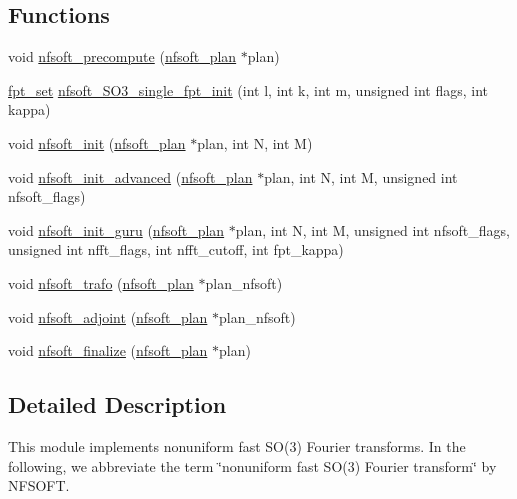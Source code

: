 \subsection*{Functions}
\begin{DoxyCompactItemize}
\item 
void \hyperlink{group__nfsoft_ga123df5d17a0d43fe5e061ac0fb8c1d23}{nfsoft\-\_\-precompute} (\hyperlink{structnfsoft__plan__}{nfsoft\-\_\-plan} $\ast$plan)
\item 
\hyperlink{nfft3_8h_a73d630ac21d6474ba0693f124d465e15}{fpt\-\_\-set} \hyperlink{group__nfsoft_gad8bf7646fcf34c3cda08123798ca5c95}{nfsoft\-\_\-\-S\-O3\-\_\-single\-\_\-fpt\-\_\-init} (int l, int k, int m, unsigned int flags, int kappa)
\item 
void \hyperlink{group__nfsoft_ga31c884458165fa204073c6c16c10775e}{nfsoft\-\_\-init} (\hyperlink{structnfsoft__plan__}{nfsoft\-\_\-plan} $\ast$plan, int N, int M)
\item 
void \hyperlink{group__nfsoft_gaf4aec4ee2a2a5d56ca27c4f1a7f90b18}{nfsoft\-\_\-init\-\_\-advanced} (\hyperlink{structnfsoft__plan__}{nfsoft\-\_\-plan} $\ast$plan, int N, int M, unsigned int nfsoft\-\_\-flags)
\item 
void \hyperlink{group__nfsoft_ga1c13cdd3f82f48fa41acdd313cdc2052}{nfsoft\-\_\-init\-\_\-guru} (\hyperlink{structnfsoft__plan__}{nfsoft\-\_\-plan} $\ast$plan, int N, int M, unsigned int nfsoft\-\_\-flags, unsigned int nfft\-\_\-flags, int nfft\-\_\-cutoff, int fpt\-\_\-kappa)
\item 
void \hyperlink{group__nfsoft_gae243cd75d7571a99eae53818e32355fb}{nfsoft\-\_\-trafo} (\hyperlink{structnfsoft__plan__}{nfsoft\-\_\-plan} $\ast$plan\-\_\-nfsoft)
\item 
void \hyperlink{group__nfsoft_ga08395b1dd90f9a2565685d17460afc5b}{nfsoft\-\_\-adjoint} (\hyperlink{structnfsoft__plan__}{nfsoft\-\_\-plan} $\ast$plan\-\_\-nfsoft)
\item 
void \hyperlink{group__nfsoft_ga30b5c6ae1ff496680f11ddcaad2d5a47}{nfsoft\-\_\-finalize} (\hyperlink{structnfsoft__plan__}{nfsoft\-\_\-plan} $\ast$plan)
\end{DoxyCompactItemize}


\subsection{Detailed Description}
This module implements nonuniform fast S\-O(3) Fourier transforms. In the following, we abbreviate the term \char`\"{}nonuniform fast S\-O(3) Fourier
transform\char`\"{} by N\-F\-S\-O\-F\-T. 

